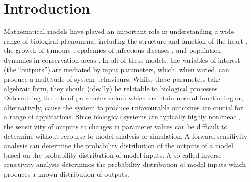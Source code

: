 \documentclass[10pt,letterpaper]{article}
\begin{document}

\section{Introduction}
\label{sec:inverse_sensitivity}

Mathematical models have played an important role in understanding a wide range of biological phenomena, including the structure and function of the heart \cite{nielsen1991mathematical,noble2004modeling}, the growth of tumours \cite{byrne2006modelling,byrne2010dissecting}, epidemics of infectious diseases \cite{anderson1992infectious}, and population dynamics in conservation areas \cite{morris2002quantitative,hanski2001spatially}. In all of these models, the variables of interest (the ``outputs'') are mediated by input parameters, which, when varied, can produce a multitude of system behaviours. Whilst these parameters take algebraic  form, they should (ideally) be relatable to biological processes. Determining the sets of parameter values which maintain normal functioning or, alternatively, cause the system to produce unfavourable outcomes are crucial for a range of applications. Since biological systems are typically highly nonlinear \cite{murray2007mathematical}, the sensitivity of outputs to changes in parameter values can be difficult to determine without recourse to model analysis or simulation. A forward sensitivity analysis can determine the probability distribution of the outputs of a model based on the probability distribution of model inputs. A so-called inverse sensitivity analysis determines the probability distribution of model inputs which produces a known distribution of outputs.
\end{document}
